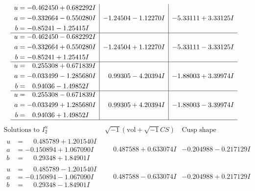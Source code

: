 \documentclass[1p]{elsarticle_modified}
\theoremstyle{definition}
\newcommand{\I}{\sqrt{-1}}
\begin{document}
$$\begin{array}{c|c|c}
\begin{aligned}
u &= -0.462450 + 0.682292 I \\
a &= -0.332664 - 0.550280 I \\
b &= -0.85241 - 1.25415 I\end{aligned}
 & -1.24504 - 1.12270 I & -5.33111 + 3.33125 I \\ \hline\begin{aligned}
u &= -0.462450 - 0.682292 I \\
a &= -0.332664 + 0.550280 I \\
b &= -0.85241 + 1.25415 I\end{aligned}
 & -1.24504 + 1.12270 I & -5.33111 - 3.33125 I \\ \hline\begin{aligned}
u &= \phantom{-}0.255308 + 0.671839 I \\
a &= -0.033499 - 1.285680 I \\
b &= \phantom{-}0.94036 - 1.49852 I\end{aligned}
 & \phantom{-}0.99305 - 4.20394 I & -1.88003 + 3.39974 I \\ \hline\begin{aligned}
u &= \phantom{-}0.255308 - 0.671839 I \\
a &= -0.033499 + 1.285680 I \\
b &= \phantom{-}0.94036 + 1.49852 I\end{aligned}
 & \phantom{-}0.99305 + 4.20394 I & -1.88003 - 3.39974 I\\
 \hline 
 \end{array}$$\newpage$$\begin{array}{c|c|c}  
\text{Solutions to }I^u_{2}& \I (\text{vol} + \sqrt{-1}CS) & \text{Cusp shape}\\
 \hline 
\begin{aligned}
u &= \phantom{-}0.485789 + 1.201540 I \\
a &= -0.150894 + 1.067090 I \\
b &= \phantom{-}0.29348 + 1.84901 I\end{aligned}
 & \phantom{-}0.487588 + 0.633074 I & -0.204988 - 0.217129 I \\ \hline\begin{aligned}
u &= \phantom{-}0.485789 - 1.201540 I \\
a &= -0.150894 - 1.067090 I \\
b &= \phantom{-}0.29348 - 1.84901 I\end{aligned}
 & \phantom{-}0.487588 - 0.633074 I & -0.204988 + 0.217129 I \\ \hline\begin{aligned}

\end{aligned}
\end{array}$$
\end{document}
